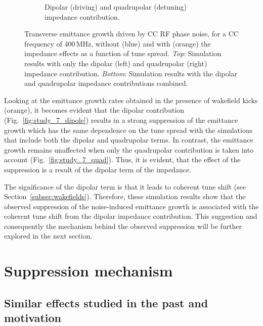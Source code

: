 \begin{figure}[htp]
\begin{subfigure}{.45\textwidth}
        \caption{Dipolar (driving) and quadrupolar (detuning) impedance contribution.}
        \label{fig:study_7_dipole_and_quad}
    \end{subfigure}   
    \caption{Transverse emittance growth driven by CC RF phase noise, for a CC frequency of 400\,MHz, without (blue) and with (orange) the impedance effects as a function of tune spread. \textit{Top}: Simulation results with only the dipolar (left) and quadrupolar (right) impedance contribution. \textit{Bottom}: Simulation results with the dipolar and quadrupolar impedance contributions combined.}
    \label{fig:study_7_dipole_vs_quadrupole}
\end{figure}

Looking at the emittance growth rates obtained in the presence of wakefield kicks (orange), it becomes evident that the dipolar contribution (Fig.~\ref{fig:study_7_dipole}) results in a strong suppression of the emittance growth which has the same dependence on the tune spread with the simulations that include both the dipolar and quadrupolar terms. In contrast, the emittance growth remains unaffected when only the quadrupolar contribution is taken into account (Fig.~\ref{fig:study_7_quad}). Thus, it is evident, that the effect of the suppression is a result of the dipolar term of the impedance. 

The significance of the dipolar term is that it leads to coherent tune shift (see Section~\ref{subsec:wakefields}). Therefore, these simulation results show that the observed suppression of the noise-induced emittance growth is associated with the coherent tune shift from the dipolar impedance contribution. This suggestion and consequently the mechanism behind the observed suppression will be further explored in the next section.


\section{Suppression mechanism}\label{sec:suppression_mechanism}


\subsection{Similar effects studied in the past and motivation}\label{subsec:past_studies_impedance_suppression_BB}

